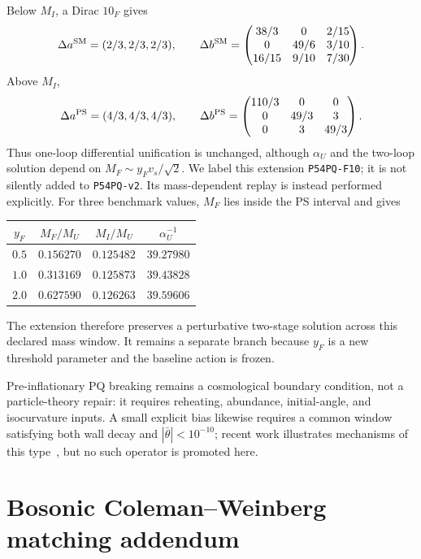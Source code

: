 \documentclass[11pt]{article}
\begin{document}
Below $M_I$, a Dirac $10_F$ gives
\begin{equation}
 \Delta a^{\rm SM}=(2/3,2/3,2/3),\qquad
 \Delta b^{\rm SM}=
 \begin{pmatrix}
 38/3&0&2/15\\0&49/6&3/10\\16/15&9/10&7/30
 \end{pmatrix}.
 \label{eq:F10SM}
\end{equation}
Above $M_I$,
\begin{equation}
 \Delta a^{\rm PS}=(4/3,4/3,4/3),\qquad
 \Delta b^{\rm PS}=
 \begin{pmatrix}
 110/3&0&0\\0&49/3&3\\0&3&49/3
 \end{pmatrix}.
 \label{eq:F10PS}
\end{equation}
Thus one-loop differential unification is unchanged, although
$\alpha_U$ and the two-loop solution depend on
$M_F\sim y_Fv_s/\sqrt2$.  We label this extension
\texttt{P54PQ-F10}; it is not silently added to \texttt{P54PQ-v2}.  Its
mass-dependent replay is instead performed explicitly.  For three benchmark
values, $M_F$ lies inside the PS interval and gives
\begin{center}
\begin{tabular}{@{}cccc@{}}
\toprule
$y_F$ & $M_F/M_U$ & $M_I/M_U$ & $\alpha_U^{-1}$\\
\midrule
$0.5$ & $0.156270$ & $0.125482$ & $39.27980$\\
$1.0$ & $0.313169$ & $0.125873$ & $39.43828$\\
$2.0$ & $0.627590$ & $0.126263$ & $39.59606$\\
\bottomrule
\end{tabular}
\end{center}
The extension therefore preserves a perturbative two-stage solution across
this declared mass window.  It remains a separate branch because $y_F$ is a
new threshold parameter and the baseline action is frozen.

Pre-inflationary PQ breaking remains a cosmological boundary condition, not
a particle-theory repair: it requires reheating, abundance, initial-angle,
and isocurvature inputs.  A small explicit bias likewise requires a common
window satisfying both wall decay and $|\bar\theta|<10^{-10}$; recent work
illustrates mechanisms of this type~\cite{Zhang2023}, but no such operator is
promoted here.

\section{Bosonic Coleman--Weinberg matching addendum}
\end{document}
